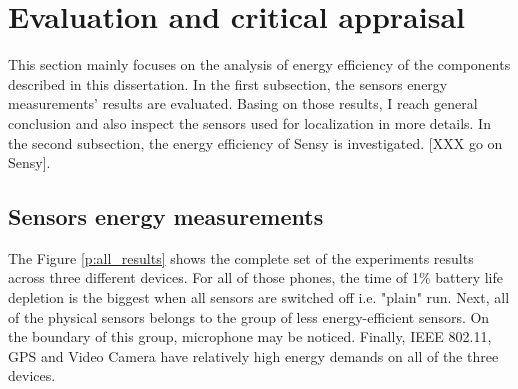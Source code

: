 \section{Evaluation and critical appraisal}
\label{s:evaluation}

\hspace{10pt} This section mainly focuses on the analysis of energy efficiency of the components described in this dissertation. In the first subsection, the sensors energy measurements' results are evaluated. Basing on those results, I reach general conclusion and also inspect the sensors used for localization in more details.  In the second subsection, the energy efficiency of Sensy is investigated. [XXX go on Sensy].

\subsection{Sensors energy measurements}

\hspace{10pt} The Figure \ref{p:all_results} shows the complete set of the experiments results across three different devices. For all of those phones, the time of 1\% battery life depletion is the biggest when all sensors are switched off i.e. "plain" run. Next, all of the physical sensors belongs to the group of less energy-efficient sensors. On the boundary of this group, microphone may be noticed. Finally, IEEE 802.11, GPS and Video Camera have relatively high energy demands on all of the three devices.


